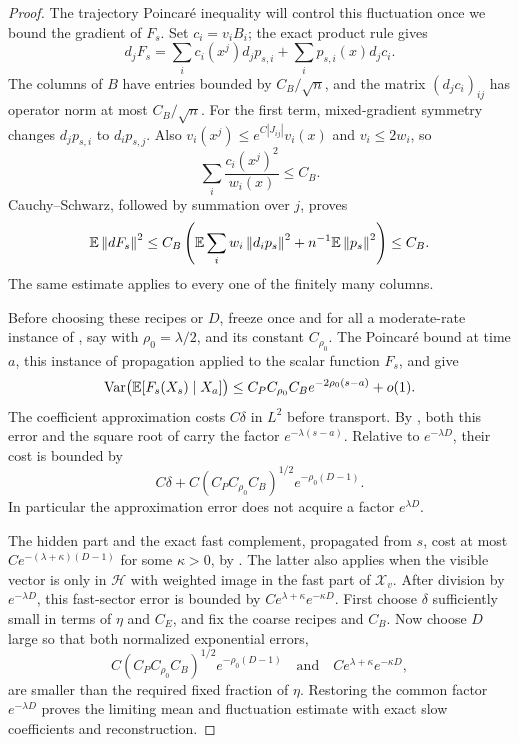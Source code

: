 \begin{proof}
The trajectory Poincar\'e inequality will control this fluctuation once
we bound the gradient of $F_s$.  Set $c_i=v_iB_i$; the exact product rule
gives
\[
 d_jF_s=\sum_i c_i(x^j)d_jp_{s,i}
                   +\sum_i p_{s,i}(x)d_jc_i.
\]
The columns of $B$ have entries bounded by $C_B/\sqrt n$, and the
matrix $(d_jc_i)_{ij}$ has operator norm at most $C_B/\sqrt n$.
For the first term, mixed-gradient symmetry changes
$d_jp_{s,i}$ to $d_ip_{s,j}$.  Also
$v_i(x^j)\le e^{C|J_{ij}|}v_i(x)$ and $v_i\le2w_i$, so
\[
 \sum_i\frac{c_i(x^j)^2}{w_i(x)}\le C_B.
\]
Cauchy--Schwarz, followed by summation over $j$, proves
\begin{equation}
 \mathbb E\left\lVert dF_s\right\rVert^2
 \le C_B\left(
   \mathbb E\sum_iw_i\left\lVert d_ip_s\right\rVert^2+n^{-1}\mathbb E\left\lVert p_s\right\rVert^2\right)
 \le C_B.
 \label{eq:cutoff-coefficient-derivative}
\end{equation}
The same estimate applies to every one of the finitely many columns.

Before choosing these recipes or $D$, freeze once and for all a
moderate-rate instance of , say with
$\rho_0=\lambda/2$, and its constant $C_{\rho_0}$.  The Poincar\'e
bound at time $a$, this instance of propagation applied to the scalar
function $F_s$, and  give
\begin{equation}
 \operatorname{Var}\bigl(\mathbb E[F_s(X_s)\mid X_a]\bigr)
 \le C_P C_{\rho_0}C_B e^{-2\rho_0(s-a)}+o(1).
 \label{eq:cutoff-coefficient-fluctuation}
\end{equation}
The coefficient approximation costs $C\delta$ in $L^2$ before
transport.  By , both this error and
the square root of  carry
the factor $e^{-\lambda(s-a)}$.  Relative to
$e^{-\lambda D}$, their cost is bounded by
\[
 C\delta+C(C_PC_{\rho_0}C_B)^{1/2}e^{-\rho_0(D-1)}.
\]
In particular the approximation error does not acquire a factor
$e^{\lambda D}$.

The hidden part and the exact fast complement, propagated from
$s$, cost at most
$C e^{-(\lambda+\kappa)(D-1)}$ for some $\kappa>0$, by
.
The latter also applies when the visible vector is only in
$\mathcal H$ with weighted image in the fast part of $\mathcal X_v$.
After division by $e^{-\lambda D}$, this fast-sector error is bounded by
$C e^{\lambda+\kappa}e^{-\kappa D}$.
First choose $\delta$ sufficiently small in terms of $\eta$ and $C_E$,
and fix the coarse recipes and $C_B$.  Now choose $D$ large so that
both normalized exponential errors,
\[
 C(C_PC_{\rho_0}C_B)^{1/2}e^{-\rho_0(D-1)}
 \quad\text{and}\quad C e^{\lambda+\kappa}e^{-\kappa D},
\]
are smaller than the required fixed fraction of $\eta$.
Restoring the common factor $e^{-\lambda D}$ proves the limiting mean
and fluctuation estimate with exact slow coefficients and reconstruction.


\end{proof}
